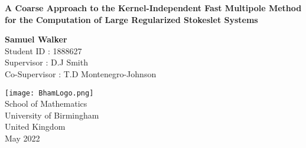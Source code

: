 \begin{titlepage}
    \begin{center}
        \vspace*{1cm}

        \LARGE
        \textbf{A Coarse Approach to the Kernel-Independent Fast Multipole Method for the Computation of Large Regularized Stokeslet Systems}

        \normalsize
        
        \vspace{1.5cm}
        
        \textbf{Samuel Walker}\\
        Student ID : 1888627 \\
        Supervisor : D.J Smith \\
        Co-Supervisor : T.D Montenegro-Johnson
        
        \vfill
        
        \vspace{0.8cm}
        
        \texttt{[image: BhamLogo.png]}\\
        
        \normalsize
        School of Mathematics\\
        University of Birmingham\\
        United Kingdom\\
        May 2022
            
    \end{center}
\end{titlepage}



